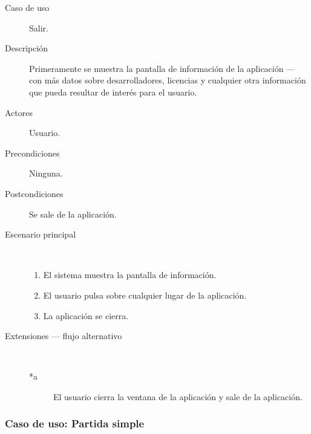 \begin{description}
    \item[Caso de uso] Salir.
    \item[Descripción] Primeramente se muestra la pantalla de información de la aplicación --- con más datos
            sobre desarrolladores, licencias y cualquier otra información que pueda resultar de interés para
            el usuario.
    \item[Actores] Usuario.
    \item[Precondiciones] Ninguna.
    \item[Postcondiciones] Se sale de la aplicación.
    \item[Escenario principal] $\quad$
        \begin{enumerate}
            \item El sistema muestra la pantalla de información.
            \item El usuario pulsa sobre cualquier lugar de la aplicación.
            \item La aplicación se cierra.
        \end{enumerate}
    \item[Extensiones --- flujo alternativo] $\quad$
        \begin{description}
            \item[*a ] El usuario cierra la ventana de la aplicación y sale de la aplicación.
        \end{description}
\end{description}
 

\subsubsection{Caso de uso: Partida simple}

